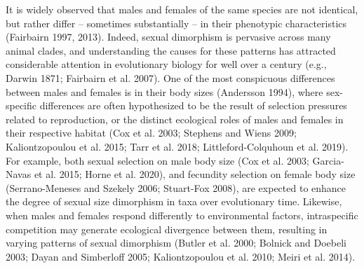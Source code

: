\documentclass[]{article}
\begin{document}
It is widely observed that males and females of the same species are not
identical, but rather differ -- sometimes substantially -- in their
phenotypic characteristics (Fairbairn 1997, 2013). Indeed, sexual
dimorphism is pervasive across many animal clades, and understanding the
causes for these patterns has attracted considerable attention in
evolutionary biology for well over a century (e.g., Darwin 1871;
Fairbairn et al. 2007). One of the most conspicuous differences between
males and females is in their body sizes (Andersson 1994), where
sex-specific differences are often hypothesized to be the result of
selection pressures related to reproduction, or the distinct ecological
roles of males and females in their respective habitat (Cox et al. 2003;
Stephens and Wiens 2009; Kaliontzopoulou et al. 2015; Tarr et al. 2018;
Littleford-Colquhoun et al. 2019). For example, both sexual selection on
male body size (Cox et al. 2003; Garcia-Navas et al. 2015; Horne et al.
2020), and fecundity selection on female body size (Serrano-Meneses and
Szekely 2006; Stuart-Fox 2008), are expected to enhance the degree of
sexual size dimorphism in taxa over evolutionary time. Likewise, when
males and females respond differently to environmental factors,
intraspecific competition may generate ecological divergence between
them, resulting in varying patterns of sexual dimorphism (Butler et al.
2000; Bolnick and Doebeli 2003; Dayan and Simberloff 2005;
Kaliontzopoulou et al. 2010; Meiri et al. 2014). \hfill\break
\end{document}
